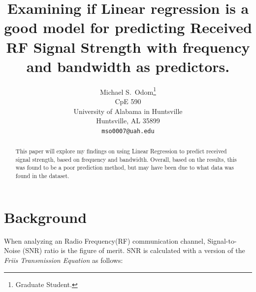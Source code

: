 \documentclass{article}
\title{Examining if Linear regression is a good model for predicting Received RF Signal Strength with frequency and bandwidth as predictors.}
\author{%
  Michael S.~Odom\thanks{Graduate Student.} \\
  CpE 590\\
  University of Alabama in Huntsville\\
  Huntsville, AL 35899 \\
  \texttt{mso0007@uah.edu} \\
}
\begin{document}
\maketitle


\begin{abstract}
  This paper will explore my findings on using Linear Regression to predict received signal strength, based on frequency and bandwidth. Overall, based on the results, this was found to be a poor prediction method, but may have been due to what data was found in the dataset.
\end{abstract}


\section{Background}


When analyzing an Radio Frequency(RF) communication channel, Signal-to-Noise (SNR) ratio is the figure of merit. SNR is calculated with a version of the \emph{Friis Transmission Equation} as follows: 
\end{document}
